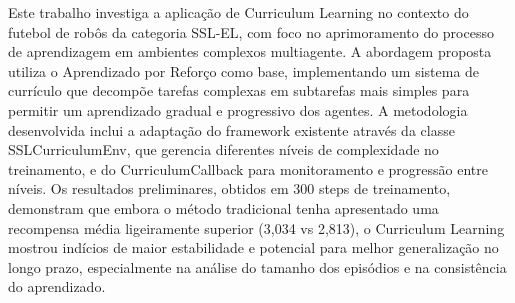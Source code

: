 
\begin{resumo} 

Este trabalho investiga a aplicação de Curriculum Learning no contexto do futebol de robôs da categoria SSL-EL, com foco no aprimoramento do processo de aprendizagem em ambientes complexos multiagente. A abordagem proposta utiliza o Aprendizado por Reforço como base, implementando um sistema de currículo que decompõe tarefas complexas em subtarefas mais simples para permitir um aprendizado gradual e progressivo dos agentes. A metodologia desenvolvida inclui a adaptação do framework existente através da classe SSLCurriculumEnv, que gerencia diferentes níveis de complexidade no treinamento, e do CurriculumCallback para monitoramento e progressão entre níveis. Os resultados preliminares, obtidos em 300 steps de treinamento, demonstram que embora o método tradicional tenha apresentado uma recompensa média ligeiramente superior (3,034 vs 2,813), o Curriculum Learning mostrou indícios de maior estabilidade e potencial para melhor generalização no longo prazo, especialmente na análise do tamanho dos episódios e na consistência do aprendizado.

\end{resumo}

